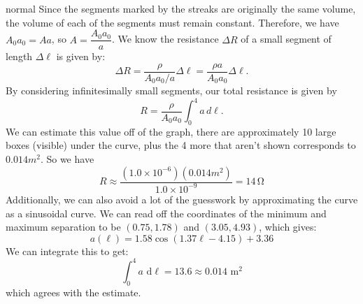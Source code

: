 \begin{solution}{normal}
Since the segments marked by the streaks are originally the same volume, the volume of each of the segments must remain constant. Therefore, we have $A_0a_0 = Aa$, so $A = \dfrac{A_0a_0}{a}$. We know the resistance $\Delta R$ of a small segment of length $\Delta \ell$ is given by:
$$\Delta R = \dfrac{\rho}{A_0a_0/a}\Delta \ell = \dfrac{\rho a}{A_0a_0}\Delta \ell .$$By considering infinitesimally small segments, our total resistance is given by
$$R = \dfrac{\rho}{A_0a_0}\int_0^4a \, d\ell.$$We can estimate this value off of the graph, there are approximately 10 large boxes (visible) under the curve, plus the 4 more that aren't shown corresponds to $0.014 m^2$. So we have
$$R \approx \dfrac{(1.0\times 10^{-6})(0.014 m^2)}{1.0\times 10^{-9}} = \boxed{14 \, \mathrm{\Omega}}$$Additionally, we can also avoid a lot of the guesswork by approximating the curve as a sinusoidal curve. We can read off the coordinates of the minimum and maximum separation to be $(0.75, 1.78)$ and $(3.05, 4.93)$, which gives:
$$a(\ell) = 1.58\cos(1.37\ell - 4.15) + 3.36$$We can integrate this to get:
$$\int_0^4 a \text{ d}\ell = 13.6 \approx 0.014 \text{ m}^2$$which agrees with the estimate.
\end{solution}